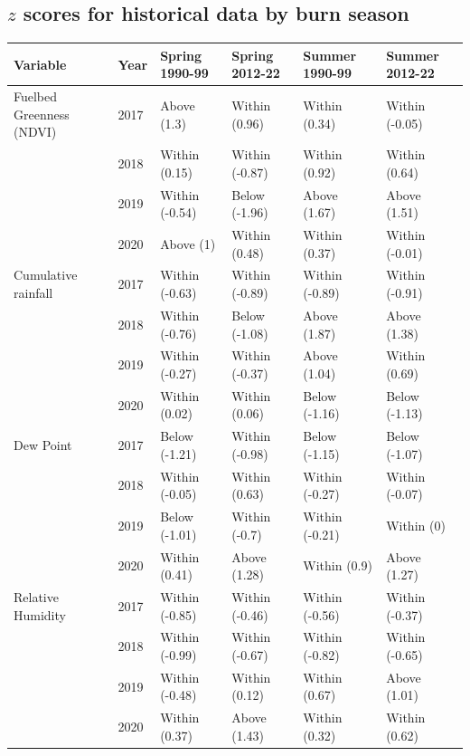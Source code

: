 \documentclass[
]{article}
\begin{document}
\clearpage

\subsection{\texorpdfstring{\(z\) scores for historical data by burn
season}{z scores for historical data by burn season}}\label{z-scores-for-historical-data-by-burn-season}

\begin{table}[ht]
\centering
\begin{tabular}{llllll}
  \hline
Variable & Year & Spring 1990-99 & Spring 2012-22 & Summer 1990-99 & Summer 2012-22 \\ 
  \hline
Fuelbed Greenness (NDVI) & 2017 & Above (1.3) & Within (0.96) & Within (0.34) & Within (-0.05) \\ 
    & 2018 & Within (0.15) & Within (-0.87) & Within (0.92) & Within (0.64) \\ 
    & 2019 & Within (-0.54) & Below (-1.96) & Above (1.67) & Above (1.51) \\ 
    & 2020 & Above (1) & Within (0.48) & Within (0.37) & Within (-0.01) \\ 
  Cumulative rainfall & 2017 & Within (-0.63) & Within (-0.89) & Within (-0.89) & Within (-0.91) \\ 
    & 2018 & Within (-0.76) & Below (-1.08) & Above (1.87) & Above (1.38) \\ 
    & 2019 & Within (-0.27) & Within (-0.37) & Above (1.04) & Within (0.69) \\ 
    & 2020 & Within (0.02) & Within (0.06) & Below (-1.16) & Below (-1.13) \\ 
  Dew Point & 2017 & Below (-1.21) & Within (-0.98) & Below (-1.15) & Below (-1.07) \\ 
    & 2018 & Within (-0.05) & Within (0.63) & Within (-0.27) & Within (-0.07) \\ 
    & 2019 & Below (-1.01) & Within (-0.7) & Within (-0.21) & Within (0) \\ 
    & 2020 & Within (0.41) & Above (1.28) & Within (0.9) & Above (1.27) \\ 
  Relative Humidity & 2017 & Within (-0.85) & Within (-0.46) & Within (-0.56) & Within (-0.37) \\ 
    & 2018 & Within (-0.99) & Within (-0.67) & Within (-0.82) & Within (-0.65) \\ 
    & 2019 & Within (-0.48) & Within (0.12) & Within (0.67) & Above (1.01) \\ 
    & 2020 & Within (0.37) & Above (1.43) & Within (0.32) & Within (0.62) \\ 

\end{tabular}
\end{table}
\end{document}
